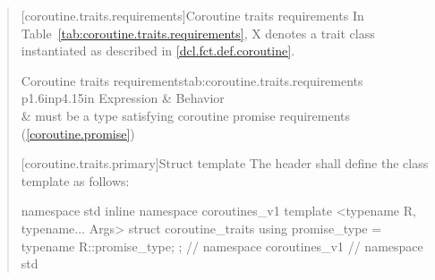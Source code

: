 \begin{quote}
[coroutine.traits.requirements]{Coroutine traits requirements}
\pnum
In Table~\ref{tab:coroutine.traits.requirements}, X denotes 
a trait class instantiated as described in \ref{dcl.fct.def.coroutine}.


\begin{concepttable}{Coroutine traits requirements}{tab:coroutine.traits.requirements}
  {p{1.6in}p{4.15in}}
  \topline
  Expression          &   Behavior \\ \capsep
       &
   must be a type satisfying coroutine promise requirements (\ref{coroutine.promise}) 
% 
\\ 
\end{concepttable}

[coroutine.traits.primary]{Struct template }
\pnum The header  shall define
the class template  as follows:

%
\begin{codeblock}
namespace std {
inline namespace coroutines_v1 {
  template <typename R, typename... Args>
  struct coroutine_traits {
    using promise_type = typename R::promise_type;
  };
} // namespace coroutines_v1
} // namespace std
\end{codeblock}


\end{quote}
